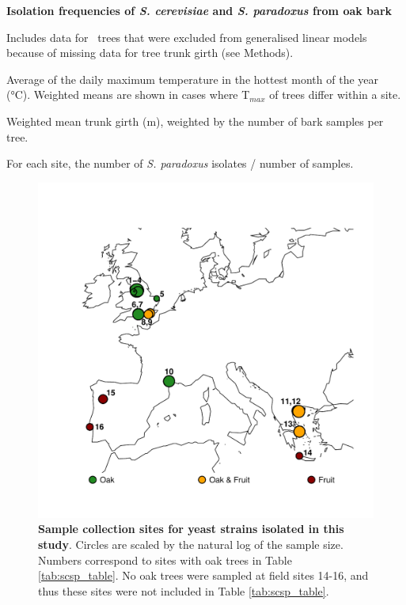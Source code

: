 \documentclass[12pt]{article}
\begin{document}
\begingroup
\renewcommand*{\thefootnote}{\alph{footnote}}
\setcounter{footnote}{0}
\begin{table}[h!] \centering 
 \begin{threeparttable}
\caption{{\bf Isolation frequencies of \textit{S. cerevisiae} and \textit{S. paradoxus} from oak bark}} 
      \label{tab:scsp_table}

    \begin{tablenotes}
      \small
      \item [a] Includes data for \missingcircum\ trees that were excluded from generalised linear models because of missing data for tree trunk girth (see Methods). 
      \item [b] Average of the daily maximum temperature in the hottest month of the year (\si{\degreeCelsius}). Weighted means are shown in cases where T$_{max}$ of trees differ within a site. 
      \item [c] Weighted mean trunk girth (m), weighted by the number of bark samples per tree. 
      \item [d] For each site, the number of \textit{S. paradoxus} isolates / number of samples.
    \end{tablenotes}
 \end{threeparttable}
\end{table}
\clearpage



\begin{figure}[h!] \centering 
\includegraphics[width=1.0\textwidth]{../figs_tables/Figure1Sampling.pdf} 
\caption{{\bf Sample collection sites for yeast strains isolated in this study}. Circles are scaled by the natural log of the sample size. Numbers correspond to sites with oak trees in Table \ref{tab:scsp_table}. No oak trees were sampled at field sites 14-16, and thus these sites were not included in Table \ref{tab:scsp_table}.}
\label{fig:sampling_figure} 
\end{figure}
\clearpage
\end{document}
